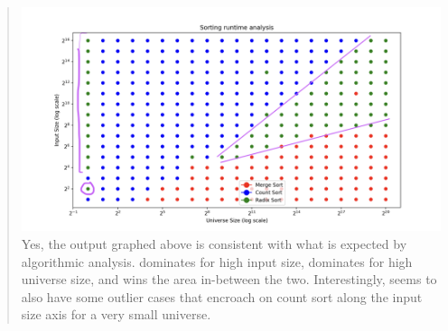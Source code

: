 \documentclass[11pt]{article}
\begin{document}
\begin{enumerate}
\begin{enumerate}
          
    \begin{quote}
        \color{purple}
        \includegraphics[scale=0.35]{graphs/sort_analysis.png}
        \newline
        Yes, the output graphed above is consistent with what is expected by algorithmic analysis. \CountingSort dominates for high input size, \MergeSort dominates for high universe size, and \RadixSort wins the area in-between the two. Interestingly, \RadixSort seems to also have some outlier cases that encroach on count sort along the input size axis for a very small universe.
    \end{quote}
        \end{enumerate}

\end{enumerate}
\end{document}
